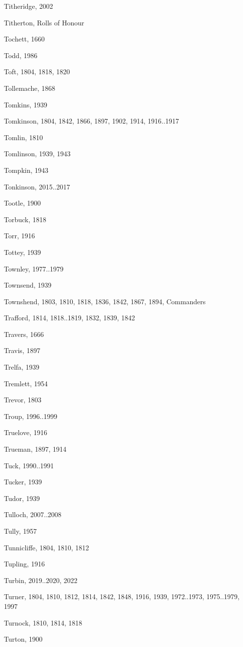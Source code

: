 {\begin{theindex}
\item Titheridge, 2002
\item Titherton, Rolls of Honour
\item Tochett, 1660
\item Todd, 1986
\item Toft, 1804, 1818, 1820
\item Tollemache, 1868
\item Tomkins, 1939
\item Tomkinson, 1804, 1842, 1866, 1897, 1902, 1914, 1916..1917
\item Tomlin, 1810
\item Tomlinson, 1939, 1943
\item Tompkin, 1943
\item Tonkinson, 2015..2017
\item Tootle, 1900
\item Torbuck, 1818
\item Torr, 1916
\item Tottey, 1939
\item Townley, 1977..1979
\item Townsend, 1939
\item Townshend, 1803, 1810, 1818, 1836, 1842, 1867, 1894, Commanders
\item Trafford, 1814, 1818..1819, 1832, 1839, 1842
\item Travers, 1666
\item Travis, 1897
\item Trelfa, 1939
\item Tremlett, 1954
\item Trevor, 1803
\item Troup, 1996..1999
\item Truelove, 1916
\item Trueman, 1897, 1914
\item Tuck, 1990..1991
\item Tucker, 1939
\item Tudor, 1939
\item Tulloch, 2007..2008
\item Tully, 1957
\item Tunnicliffe, 1804, 1810, 1812
\item Tupling, 1916
\item Turbin, 2019..2020, 2022
\item Turner, 1804, 1810, 1812, 1814, 1842, 1848, 1916, 1939, 1972..1973, 1975..1979, 1997
\item Turnock, 1810, 1814, 1818
\item Turton, 1900

\end{theindex}}
